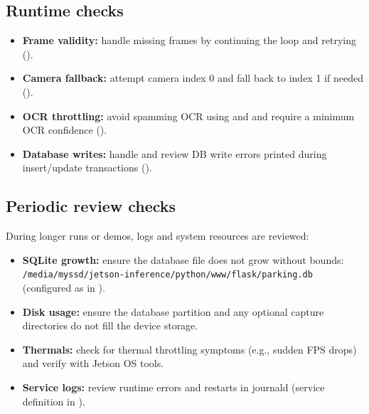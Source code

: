 \subsection{Runtime checks}

\begin{itemize}
	\item \textbf{Frame validity:} handle missing frames by continuing the loop and retrying
	().
	
	\item \textbf{Camera fallback:} attempt camera index 0 and fall back to index 1 if needed
	().
	
	\item \textbf{OCR throttling:} avoid spamming OCR using  and
	 and require a minimum OCR confidence
	().
	
	\item \textbf{Database writes:} handle and review DB write errors printed during insert/update transactions
	().
\end{itemize}

\subsection{Periodic review checks}

\noindent
During longer runs or demos, logs and system resources are reviewed:
\begin{itemize}
	\item \textbf{SQLite growth:} ensure the database file does not grow without bounds:
	\texttt{/media/myssd/\allowbreak jetson-inference/\allowbreak python/www/flask/\allowbreak parking.db}
	(configured as  in
	).
	
	\item \textbf{Disk usage:} ensure the database partition and any optional capture directories do not fill the device storage.
	
	\item \textbf{Thermals:} check for thermal throttling symptoms (e.g., sudden FPS drops) and verify with Jetson OS tools.
	
	\item \textbf{Service logs:} review runtime errors and restarts in journald
	(service definition in ).
\end{itemize}

